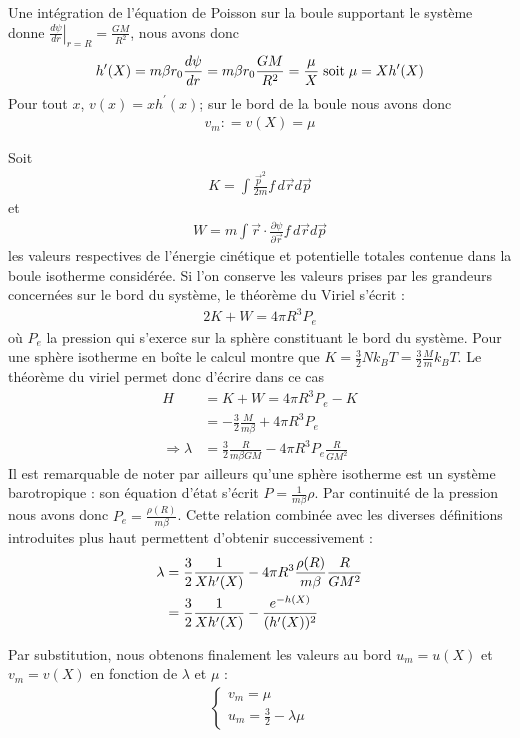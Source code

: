 	Une intégration de l'équation de Poisson sur la boule supportant le système donne $\left.\frac{d \psi}{dr}
	\right|_{r=R}= \frac{GM}{R^2}$, nous avons donc 
	\begin{align*}
		h'(X) = m\beta r_0 \frac{d \psi}{dr} = m\beta r_0 \frac{GM}{R^2} = \frac{\mu}{X} \;\textrm{soit}\; \mu = Xh'(X)
	\end{align*}
	Pour tout $x$, $v(x)=xh^{\prime}(x)$; sur le bord de la boule nous avons donc
	\begin{align}
		 v_m: = v\left(X\right) = \mu\label{vmmu}
	\end{align}

	Soit 
	\begin{align*}K=\int \frac{\vec{p}^2}{2m}f\, d\vec{r}d\vec{p}\end{align*}
	et 
	\begin{align*}W=m\int \vec{r}\cdot \frac{\partial \psi}{\partial \vec{r}}f\, d\vec{r}d\vec{p}\end{align*}
	les valeurs respectives de l'énergie cinétique et potentielle totales contenue dans la boule isotherme considérée. Si l'on conserve les valeurs prises par les grandeurs concernées sur le bord du système, le théorème du Viriel  s'écrit :
	\begin{align}
		2K + W = 4\pi R^3 P_e \label{virielinabox}
	\end{align}
	 où $P_e$ la pression qui s'exerce sur la sphère constituant le bord du système.
	Pour une sphère isotherme en boîte  le calcul montre que \mbox{$K = \frac{3}{2} N k_B T = \frac{3}{2} \frac{M}{m} k_B T$}. Le théorème du viriel permet donc d'écrire dans ce cas 
	\begin{align*}
		H &= K + W =  4\pi R^3 P_e - K \\
		  &= -\frac{3}{2} \frac{M}{m\beta} + 4\pi R^3 P_e \\
		\Rightarrow \lambda &= \frac{3}{2}\frac{R}{m\beta GM} - 4\pi R^3 P_e \frac{R}{GM^2}
	\end{align*}
	Il est remarquable de noter par ailleurs qu'une sphère isotherme est un système barotropique : son équation d'état s'écrit $P=\frac{1}{m\beta}\rho$. Par continuité de la pression nous avons donc $P_e = \frac{\rho(R)}{m\beta}$. Cette relation combinée avec les diverses définitions introduites plus haut permettent d'obtenir successivement  :
	\begin{align}
		\lambda &= \frac{3}{2}\frac{1}{Xh'(X)} - 4\pi R^3 \frac{\rho(R)}{m\beta} \frac{R}{GM^2} \notag \\
			&= \frac{3}{2}\frac{1}{Xh'(X)} - \frac{e^{-h(X)}}{(h'(X))^2}\label{lamum}
	\end{align}

	Par substitution, nous obtenons finalement les valeurs au bord $u_m=u(X)$ et $v_m=v(X)$ en fonction de $\lambda$ et $\mu$ :
	\begin{align}
		\label{uv_max}
		\left\{\begin{array}{l}
			v_m = \mu \\
			u_m = \frac{3}{2} - \lambda \mu
		\end{array}\right.
	\end{align}

